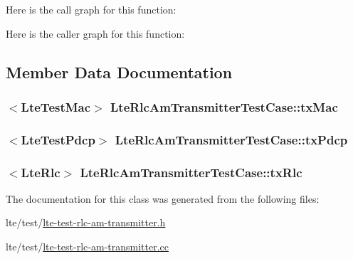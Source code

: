 Here is the call graph for this function\+:




Here is the caller graph for this function\+:




\subsection{Member Data Documentation}
\subsubsection[{\texorpdfstring{tx\+Mac}{txMac}}]{$<${\bf Lte\+Test\+Mac}$>$ Lte\+Rlc\+Am\+Transmitter\+Test\+Case\+::tx\+Mac\hspace{0.3cm}{\ttfamily [protected]}}\hypertarget{classLteRlcAmTransmitterTestCase_aef4a21987514cf7f0b7a71794022f096}{}\label{classLteRlcAmTransmitterTestCase_aef4a21987514cf7f0b7a71794022f096}
\subsubsection[{\texorpdfstring{tx\+Pdcp}{txPdcp}}]{$<${\bf Lte\+Test\+Pdcp}$>$ Lte\+Rlc\+Am\+Transmitter\+Test\+Case\+::tx\+Pdcp\hspace{0.3cm}{\ttfamily [protected]}}\hypertarget{classLteRlcAmTransmitterTestCase_a05f1f1654108d96efa96f08f3cfa9157}{}\label{classLteRlcAmTransmitterTestCase_a05f1f1654108d96efa96f08f3cfa9157}
\subsubsection[{\texorpdfstring{tx\+Rlc}{txRlc}}]{$<${\bf Lte\+Rlc}$>$ Lte\+Rlc\+Am\+Transmitter\+Test\+Case\+::tx\+Rlc\hspace{0.3cm}{\ttfamily [protected]}}\hypertarget{classLteRlcAmTransmitterTestCase_ae91b4ccc5c47381419e1cc945ffbd500}{}\label{classLteRlcAmTransmitterTestCase_ae91b4ccc5c47381419e1cc945ffbd500}


The documentation for this class was generated from the following files\+:\begin{DoxyCompactItemize}
\item 
lte/test/\hyperlink{lte-test-rlc-am-transmitter_8h}{lte-\/test-\/rlc-\/am-\/transmitter.\+h}\item 
lte/test/\hyperlink{lte-test-rlc-am-transmitter_8cc}{lte-\/test-\/rlc-\/am-\/transmitter.\+cc}\end{DoxyCompactItemize}
